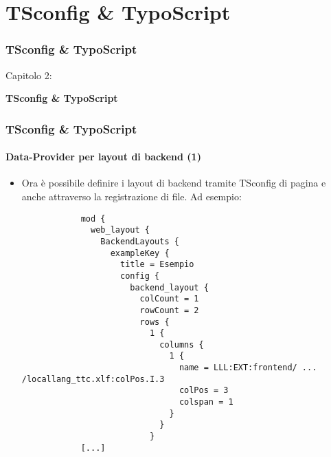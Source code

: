 %

\section{TSconfig \& TypoScript}
\begin{frame}[fragile]
	\frametitle{TSconfig \& TypoScript}

	\begin{center}\huge{Capitolo 2:}\end{center}
	\begin{center}\huge{\color{typo3darkgrey}\textbf{TSconfig \& TypoScript}}\end{center}

\end{frame}

\begin{frame}[fragile]
	\frametitle{TSconfig \& TypoScript}
	\framesubtitle{Data-Provider per layout di backend (1)}

	\lstset{basicstyle=\tiny\ttfamily}

	\begin{itemize}
		\item Ora è possibile definire i layout di backend tramite TSconfig di pagina e anche attraverso la registrazione di file. Ad esempio:

		\begin{lstlisting}
			mod {
			  web_layout {
			    BackendLayouts {
			      exampleKey {
			        title = Esempio
			        config {
			          backend_layout {
			            colCount = 1
			            rowCount = 2
			            rows {
			              1 {
			                columns {
			                  1 {
			                    name = LLL:EXT:frontend/ ... /locallang_ttc.xlf:colPos.I.3
			                    colPos = 3
			                    colspan = 1
			                  }
			                }
			              }
			[...]
		\end{lstlisting}

	\end{itemize}

\end{frame}

